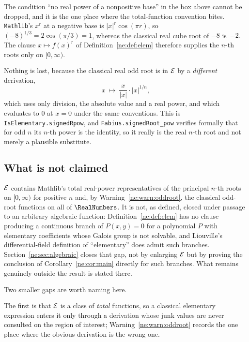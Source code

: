 \begin{warning}\label{ne:warn:oddroot}
The condition ``no real power of a nonpositive base'' in the box above cannot
be dropped, and it is the one place where the total-function convention bites.
\texttt{Mathlib}'s $x^{r}$ at a negative base is $|x|^{r}\cos(\pi r)$, so
$(-8)^{1/3}=2\cos(\pi/3)=1$, whereas the classical real cube root of $-8$
is~$-2$.  The clause $x\mapsto f(x)^{r}$ of Definition~\ref{ne:def:elem} therefore supplies
the $n$-th roots only on $[0,\infty)$.

Nothing is lost, because the classical real odd root is in $\mathcal E$ by a
\emph{different} derivation,
\[
  x\ \longmapsto\ \frac{x}{|x|}\cdot|x|^{1/n},
\]
which uses only division, the absolute value and a real power, and which
evaluates to $0$ at $x=0$ under the same conventions.  This is
\texttt{IsElementary.signedRpow}, and
\texttt{Fabius.signedRoot\_pow} verifies formally that for odd $n$ its $n$-th
power is the identity, so it really is the real $n$-th root and not merely a
plausible substitute.
\end{warning}

\subsection{What is not claimed}\label{ne:sec:notclaimed}

$\mathcal E$ contains Mathlib's total real-power representatives of the principal
$n$-th roots on $[0,\infty)$ for positive $n$ and, by
Warning~\ref{ne:warn:oddroot}, the classical odd-root functions on all of $\RealNumbers$.
It is not, as defined, closed under passage
to an arbitrary algebraic function: Definition~\ref{ne:def:elem} has no clause
producing a continuous branch of $P(x,y)=0$ for a polynomial $P$ with
elementary coefficients whose Galois group is not solvable, and Liouville's
differential-field definition of ``elementary'' does admit such branches.
Section~\ref{ne:sec:algebraic} closes that gap, not by enlarging $\mathcal E$ but by
proving the conclusion of Corollary~\ref{ne:cor:main} directly for such branches.
What remains genuinely outside the result is stated there.

Two smaller gaps are worth naming here.

The first is that $\mathcal E$ is a class of \emph{total} functions, so a classical
elementary expression enters it only through a derivation whose junk values
are never consulted on the region of interest; Warning~\ref{ne:warn:oddroot}
records the one place where the obvious derivation is the wrong one.

